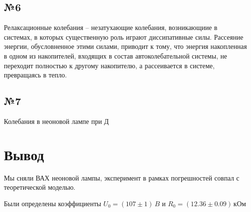 \subsection{№6}

Релаксационные колебания -- незатухающие колебания, возникающиие в системах, в которых существенную роль играют диссипативные силы. Рассеяние энергии, обусловненное этими силами, приводит к тому, что энергия  накопленная в одном из накопителей, входящих в состав автоколебательной системы, не переходит полностью к другому накопителю, а рассеивается в системе, превращаясь в тепло.

\subsection{№7}
Колебания в неоновой лампе при Д

\newpage
\section{Вывод}
Мы сняли ВАХ неоновой лампы, эксперимент в рамках погрешностей совпал с теоретической моделью. 

Были определены коэффициенты $U_0=(107\pm 1)\,B$ и $R_0=(12.36\pm 0.09)\,\text{кОм}$


